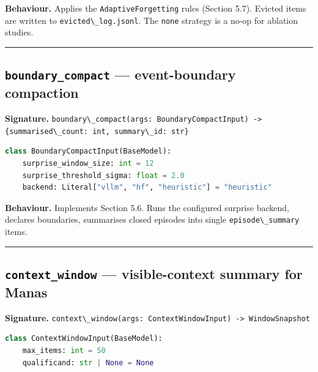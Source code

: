 \textbf{Behaviour.} Applies the \passthrough{\lstinline!AdaptiveForgetting!} rules (Section 5.7). Evicted items are written to \passthrough{\lstinline!evicted\_log.jsonl!}. The \passthrough{\lstinline!none!} strategy is a no-op for ablation studies.

\begin{center}\rule{0.5\linewidth}{0.5pt}\end{center}

\subsection{\texorpdfstring{\texttt{boundary\_compact} --- event-boundary compaction}{boundary\_compact --- event-boundary compaction}}\label{boundary_compact-event-boundary-compaction}

\textbf{Signature.} \passthrough{\lstinline!boundary\_compact(args: BoundaryCompactInput) -> \{summarised\_count: int, summary\_id: str\}!}

\begin{lstlisting}[language=Python]
class BoundaryCompactInput(BaseModel):
    surprise_window_size: int = 12
    surprise_threshold_sigma: float = 2.0
    backend: Literal["vllm", "hf", "heuristic"] = "heuristic"
\end{lstlisting}

\textbf{Behaviour.} Implements Section 5.6. Runs the configured surprise backend, declares boundaries, summarises closed episodes into single \passthrough{\lstinline!episode\_summary!} items.

\begin{center}\rule{0.5\linewidth}{0.5pt}\end{center}

\subsection{\texorpdfstring{\texttt{context\_window} --- visible-context summary for Manas}{context\_window --- visible-context summary for Manas}}\label{context_window-visible-context-summary-for-manas}

\textbf{Signature.} \passthrough{\lstinline!context\_window(args: ContextWindowInput) -> WindowSnapshot!}

\begin{lstlisting}[language=Python]
class ContextWindowInput(BaseModel):
    max_items: int = 50
    qualificand: str | None = None
\end{lstlisting}

